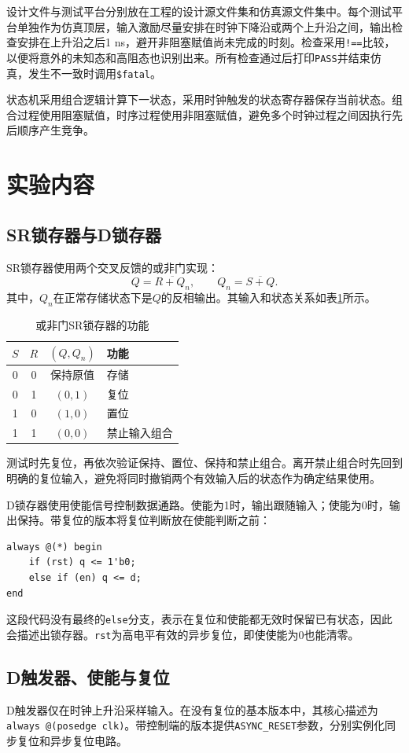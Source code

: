 \documentclass[12pt,a4paper]{ctexart}
\begin{document}
设计文件与测试平台分别放在工程的设计源文件集和仿真源文件集中。每个测试平台单独作为仿真顶层，输入激励尽量安排在时钟下降沿或两个上升沿之间，输出检查安排在上升沿之后1 ns，避开非阻塞赋值尚未完成的时刻。检查采用\texttt{!==}比较，以便将意外的未知态和高阻态也识别出来。所有检查通过后打印\texttt{PASS}并结束仿真，发生不一致时调用\texttt{\$fatal}。

状态机采用组合逻辑计算下一状态，采用时钟触发的状态寄存器保存当前状态。组合过程使用阻塞赋值，时序过程使用非阻塞赋值，避免多个时钟过程之间因执行先后顺序产生竞争。

\section{实验内容}
\subsection{SR锁存器与D锁存器}
SR锁存器使用两个交叉反馈的或非门实现：
\begin{equation}
Q=\overline{R+Q_n},\qquad Q_n=\overline{S+Q}.
\end{equation}
其中，$Q_n$在正常存储状态下是$Q$的反相输出。其输入和状态关系如表\ref{tab:sr}所示。
\begin{table}[H]
\centering
\caption{或非门SR锁存器的功能}
\label{tab:sr}
\begin{tabular}{cccl}
\toprule
$S$ & $R$ & $(Q,Q_n)$ & 功能\\
\midrule
0 & 0 & 保持原值 & 存储\\
0 & 1 & $(0,1)$ & 复位\\
1 & 0 & $(1,0)$ & 置位\\
1 & 1 & $(0,0)$ & 禁止输入组合\\
\bottomrule
\end{tabular}
\end{table}
测试时先复位，再依次验证保持、置位、保持和禁止组合。离开禁止组合时先回到明确的复位输入，避免将同时撤销两个有效输入后的状态作为确定结果使用。

D锁存器使用使能信号控制数据通路。使能为1时，输出跟随输入；使能为0时，输出保持。带复位的版本将复位判断放在使能判断之前：
\begin{lstlisting}
always @(*) begin
    if (rst) q <= 1'b0;
    else if (en) q <= d;
end
\end{lstlisting}
这段代码没有最终的\texttt{else}分支，表示在复位和使能都无效时保留已有状态，因此会描述出锁存器。\texttt{rst}为高电平有效的异步复位，即使使能为0也能清零。

\subsection{D触发器、使能与复位}
D触发器仅在时钟上升沿采样输入。在没有复位的基本版本中，其核心描述为\texttt{always @(posedge clk)}。带控制端的版本提供\texttt{ASYNC\_RESET}参数，分别实例化同步复位和异步复位电路。
\end{document}
